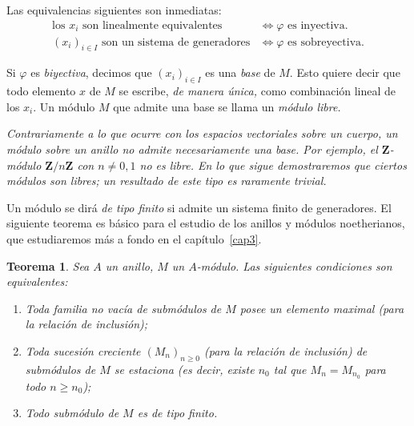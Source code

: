 \documentclass[10pt,oneside,bibtotoc,smallheadings,leqno,a5paper,DIV=12]{scrbook}
\newcommand{\ZZ}{\mathbf{Z}}
\numberwithin{equation}{section}
\newenvironment{comm}%
	{\begin{trivlist}\item\small\itshape}
	{\end{trivlist}}
\theoremstyle{defi}
\theoremstyle{enonce}
\newtheorem{theorem}{Teorema}
\theoremstyle{rem}
\numberwithin{theorem}{section}
\numberwithin{proposition}{section}
\numberwithin{definition}{section}
\numberwithin{lemma}{section}
\numberwithin{corollary}{section}
\numberwithin{example}{section}
\numberwithin{footnote}{section}%
\begin{document}
Las equivalencias siguientes son inmediatas:
\begin{align}
\text{los $x_{i}$ son linealmente equivalentes} &\iff \text{$\varphi$ es inyectiva.}\\
\text{$(x_{i})_{i\in I}$ son un sistema de generadores} &\iff \text{$\varphi$ es sobreyectiva.}
\end{align}

Si $\varphi$ es {\em biyectiva}, decimos que $(x_{i})_{i\in I}$ es una {\em base}
de $M$. Esto quiere decir que
todo elemento $x$ de $M$ se escribe, {\em de manera \'unica,} como combinaci\'on lineal
de los $x_{i}$. Un m\'odulo
$M$ que admite una base se llama un {\em m\'odulo libre.}

\begin{comm}
Contrariamente a lo que ocurre con los espacios vectoriales sobre un cuerpo, un
m\'odulo sobre un
anillo no admite necesariamente una base. Por ejemplo, el $\ZZ$-m\'odulo $\ZZ/n\ZZ$
con $n\neq 0,1$
no es libre.
En lo que sigue demostraremos que ciertos m\'odulos son libres; un resultado de este
tipo es raramente trivial.
\end{comm}

Un m\'odulo se dir\'a {\em de tipo finito} si admite un sistema finito de
generadores. El siguiente teorema
es b\'asico para el estudio de los anillos y m\'odulos noetherianos, que estudiaremos
m\'as a fondo en el cap\'itulo~\ref{cap3}.

\begin{theorem}\label{teo1.4.1}
Sea $A$ un anillo, $M$ un $A$-m\'odulo. Las siguientes condiciones son equivalentes:
\begin{enumerate}
\item Toda familia no vac\'ia de subm\'odulos de $M$ posee un elemento maximal
(para la relaci\'on de inclusi\'on);
\item Toda sucesi\'on creciente $(M_{n})_{n\geq 0}$ (para la relaci\'on de inclusi\'on)
de subm\'odulos
de $M$ se estaciona (es decir, existe $n_{0}$ tal que $M_{n} = M_{n_{0}}$ para
todo $n\geq n_{0}$);
\item Todo subm\'odulo de $M$ es de tipo finito.
\end{enumerate}
\end{theorem}
\end{document}
